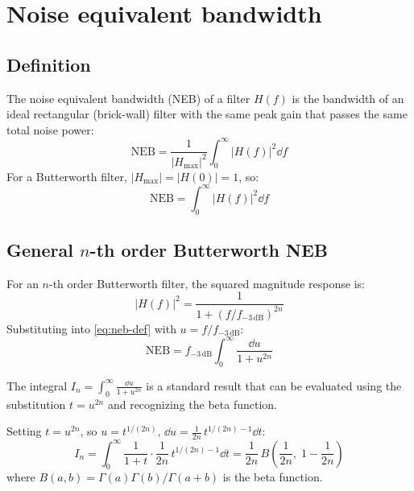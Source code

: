 \documentclass[a4paper,11pt]{article}
\begin{document}
\section{Noise equivalent bandwidth}
\label{sec:neb}

\subsection{Definition}

The noise equivalent bandwidth (NEB) of a filter $H(f)$ is the
bandwidth of an ideal rectangular (brick-wall) filter with the same
peak gain that passes the same total noise power:
\begin{equation*}
  \mathrm{NEB}
  = \frac{1}{|H_{\mathrm{max}}|^2}
    \int_0^{\infty} |H(f)|^2 \dd{f}
\end{equation*}
For a Butterworth filter, $|H_{\mathrm{max}}| = |H(0)| = 1$, so:
\begin{equation}
  \mathrm{NEB} = \int_0^{\infty} |H(f)|^2 \dd{f}
  \label{eq:neb-def}
\end{equation}

\subsection{General $n$-th order Butterworth NEB}

For an $n$-th order Butterworth filter, the squared magnitude response
is:
\begin{equation*}
  |H(f)|^2 = \frac{1}{1 + (f/f_{-3\,\mathrm{dB}})^{2n}}
\end{equation*}
Substituting into \eqref{eq:neb-def} with
$u = f/f_{-3\,\mathrm{dB}}$:
\begin{equation}
  \mathrm{NEB}
  = f_{-3\,\mathrm{dB}} \int_0^{\infty} \frac{\dd{u}}{1 + u^{2n}}
  \label{eq:neb-integral}
\end{equation}

The integral
$\displaystyle I_n = \int_0^{\infty} \frac{\dd{u}}{1 + u^{2n}}$ is a
standard result that can be evaluated using the substitution
$t = u^{2n}$ and recognizing the beta function.

Setting $t = u^{2n}$, so $u = t^{1/(2n)}$,
$\dd{u} = \frac{1}{2n}\,t^{1/(2n)-1}\dd{t}$:
\begin{equation*}
  I_n = \int_0^{\infty} \frac{1}{1+t} \cdot
        \frac{1}{2n}\,t^{1/(2n)-1}\dd{t}
      = \frac{1}{2n}\,
        B\!\left(\frac{1}{2n},\;1 - \frac{1}{2n}\right)
\end{equation*}
where $B(a,b) = \Gamma(a)\Gamma(b)/\Gamma(a+b)$ is the beta function.
\end{document}
